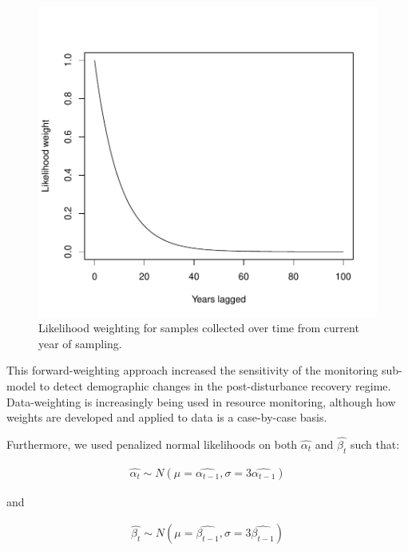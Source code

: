 \documentclass[]{article}
\begin{document}
\begin{figure}[H]

{\centering \includegraphics{Managing_for_ecological_surprises_in_metapopulations_files/figure-latex/unnamed-chunk-1-1} 

}

\caption{Likelihood weighting for samples collected over time from current year of sampling.}\label{fig:unnamed-chunk-1}
\end{figure}

This forward-weighting approach increased the sensitivity of the
monitoring sub-model to detect demographic changes in the
post-disturbance recovery regime. Data-weighting is increasingly being
used in resource monitoring, although how weights are developed and
applied to data is a case-by-case basis.

Furthermore, we used penalized normal likelihoods on both
\(\hat{\alpha_t}\) and \(\hat{\beta_t}\) such that:

\begin{align}
\hat{\alpha_t} \sim N(\mu=\hat{\alpha_{t-1}},\sigma=3\hat{\alpha_{t-1}})
\end{align}

and

\begin{align}
\hat{\beta_t} \sim N(\mu=\hat{\beta_{t-1}},\sigma=3\hat{\beta_{t-1}})
\end{align}
\end{document}

